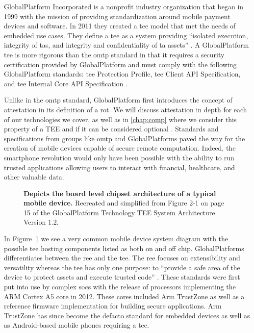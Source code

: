 GlobalPlatform Incorporated is a nonprofit industry organization that began in 1999 with the mission of providing standardization around mobile payment devices and software. In 2011 they created a \gls{tee} model \cite{GlobalPlatform2018} that met the needs of embedded use cases. They define a \gls{tee} as a system providing ``isolated execution, integrity of \glspl{ta}, and integrity and confidentiality of \gls{ta} assets'' \cite{GlobalPlatform2018}. A GlobalPlatform \gls{tee} is more rigorous than the \gls{omtp} standard in that it requires a security certification provided by GlobalPlatform and must comply with the following GlobalPlatform standards: \gls{tee} Protection Profile, \gls{tee} Client API Specification, and \gls{tee} Internal Core API Specification \cite{GPD2, GPD3, GPD4}.

Unlike in the \gls{omtp} standard, GlobalPlatform first introduces the concept of \gls{attestation} in its definition of a \gls{rot}. We will discuss \gls{attestation} in depth for each of our technologies we cover, as well as in \autoref{chap:comp} where we consider this property of a TEE and if it can be considered optional \cite{cccTAC}. Standards and specifications from groups like \gls{omtp} and GlobalPlatforms paved the way for the creation of mobile devices capable of secure remote computation. Indeed, the smartphone revolution would only have been possible with the ability to run trusted applications allowing users to interact with financial, healthcare, and other valuable data.

\begin{figure}[htbp]
\centering

\caption[GlobalPlatforms Typical Chipset Architecture]{\textbf{Depicts the board level chipset architecture of a typical mobile device.} Recreated and simplified from Figure 2-1 on page 15 of the GlobalPlatform Technology TEE System Architecture Version 1.2. \cite{GlobalPlatform2018}}
\label{fig:gpd-tee}
\end{figure}

In Figure~\ref{fig:gpd-tee} we see a very common mobile device system diagram with the possible \gls{tee} hosting components listed as both on and off chip. GlobalPlatforms differentiates between the \gls{ree} and the \gls{tee}. The \gls{ree} focuses on extensibility and versatility whereas the \gls{tee} has only one purpose: to ``provide a safe area of the device to protect assets and execute trusted code'' \cite{GlobalPlatform2018}.  These standards were first put into use by complex \glspl{soc} with the release of processors implementing the ARM Cortex A5 core in 2012. These cores included Arm TrustZone as well as a reference firmware implementation for building secure applications. Arm TrustZone has since become the defacto standard for embedded devices as well as as Android-based mobile phones requiring a \gls{tee}. 


